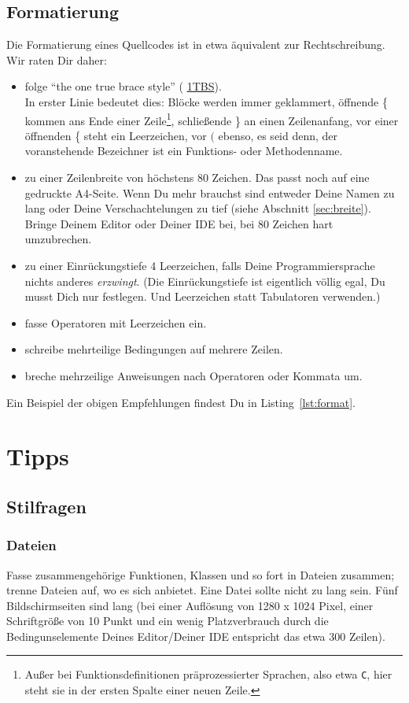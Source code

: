 \documentclass[twoside]{scrartcl}
\providecommand{\code}[1]{\texttt{#1}}
\begin{document}
\subsection{Formatierung\label{sec:format}}
Die Formatierung eines Quellcodes ist in etwa \"a{}quivalent zur
Rechtschreibung. Wir raten Dir daher:
\begin{itemize}
\item folge "`the one true brace style"' (%
\href{http://en.wikipedia.org/wiki/Indent_style#Variant:_1TBS}{1TBS}).\\
  In erster Linie bedeutet dies: Bl\"o{}cke werden immer geklammert,
  \"o{}ffnende \{ kommen ans Ende einer
      Zeile\footnote{Au\ss{}er bei Funktionsdefinitionen pr\"a{}prozessierter
      Sprachen, also etwa \code{C}, hier steht sie in der ersten Spalte einer
  neuen Zeile.}, schlie\ss{}ende \} an einen Zeilenanfang, 
      vor einer
  \"o{}ffnenden \{ steht ein Leerzeichen, vor $($ ebenso, es seid denn,
  der voranstehende Bezeichner ist ein Funktions- oder Methodenname.
\item zu einer Zeilenbreite von h\"o{}chstens 80 Zeichen. Das passt
  noch auf eine gedruckte A4-Seite. Wenn Du mehr brauchst sind
  entweder Deine Namen zu lang oder Deine Verschachtelungen zu
  tief (siehe Abschnitt \ref{sec:breite}).
  Bringe Deinem Editor oder Deiner IDE bei, bei 80 Zeichen hart
  umzubrechen.
\item zu einer Einr\"u{}ckungstiefe 4 Leerzeichen, falls Deine
  Programmiersprache nichts anderes \emph{erzwingt}.
  (Die Einr\"u{}ckungstiefe ist eigentlich v\"o{}llig egal, Du
  musst Dich nur festlegen. Und Leerzeichen statt
  Tabulatoren verwenden.)
\item fasse Operatoren mit Leerzeichen ein.
\item schreibe mehrteilige Bedingungen auf mehrere Zeilen.
\item breche mehrzeilige Anweisungen nach Operatoren oder Kommata
  um.
\end{itemize}
Ein Beispiel der obigen Empfehlungen 
findest Du in Listing~\ref{lst:format}.



\section{Tipps\label{sec:tipps}}
\subsection{Stilfragen}
\subsubsection{Dateien}
Fasse zusammengeh\"o{}rige Funktionen, Klassen und so fort in Dateien zusammen; 
trenne Dateien auf, wo es sich anbietet.
Eine Datei sollte nicht zu lang sein. F\"u{}nf Bildschirmseiten sind
lang (bei einer Aufl\"o{}sung von 1280 x 1024 Pixel, einer
Schriftgr\"o{}\ss{}e von 10 Punkt und ein wenig Platzverbrauch durch die
Bedingunselemente Deines Editor/Deiner IDE entspricht das etwa 300
Zeilen).
\end{document}
